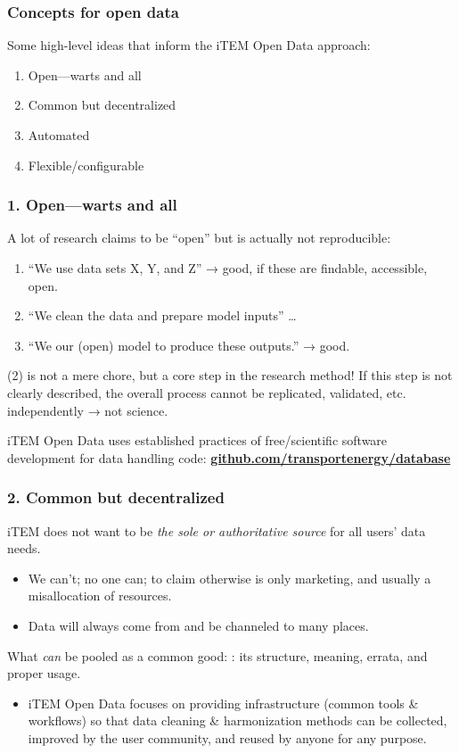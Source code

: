 \documentclass[12pt,aspectratio=169]{beamer}
\begin{document}
\begin{frame}
\frametitle{Concepts for open data}

Some high-level ideas that inform the iTEM Open Data approach:

\bigskip
\Large
\begin{enumerate}
  \item Open—warts and all
  \item Common but decentralized
  \item Automated
  \item Flexible/configurable
\end{enumerate}

\end{frame}

\begin{frame}
\frametitle{1. Open—warts and all}

A lot of research claims to be “open” but is actually not reproducible:
\begin{enumerate}
  \item “We use data sets X, Y, and Z” → good, if these are findable, accessible, open.
  \item “We clean the data and prepare model inputs” …
  \item “We our (open) model to produce these outputs.” → good.
\end{enumerate}

\medskip
(2) is not a mere chore, but a core step in the research method!
If this step is not clearly described, the overall process cannot be replicated, validated, etc. independently → not science.

\bigskip
iTEM Open Data uses established practices of free/scientific software development for data handling code: \href{https://github.com/transportenergy/database}{\bfseries github.com/transportenergy/database}
\end{frame}

\begin{frame}
\frametitle{2. Common but decentralized}

iTEM does not want to be \emph{the sole or authoritative source} for all users' data needs.
\begin{itemize}
  \item We can't; no one can; to claim otherwise is only marketing, and usually a misallocation of resources.
  \item Data will always come from and be channeled to many places.
\end{itemize}

\bigskip
What \emph{can} be pooled as a common good: : its structure, meaning, errata, and proper usage.

\begin{itemize}
  \item iTEM Open Data focuses on providing infrastructure (common tools \& workflows) so that data cleaning \& harmonization methods can be collected, improved by the user community, and reused by anyone for any purpose.
\end{itemize}

\end{frame}
\end{document}
